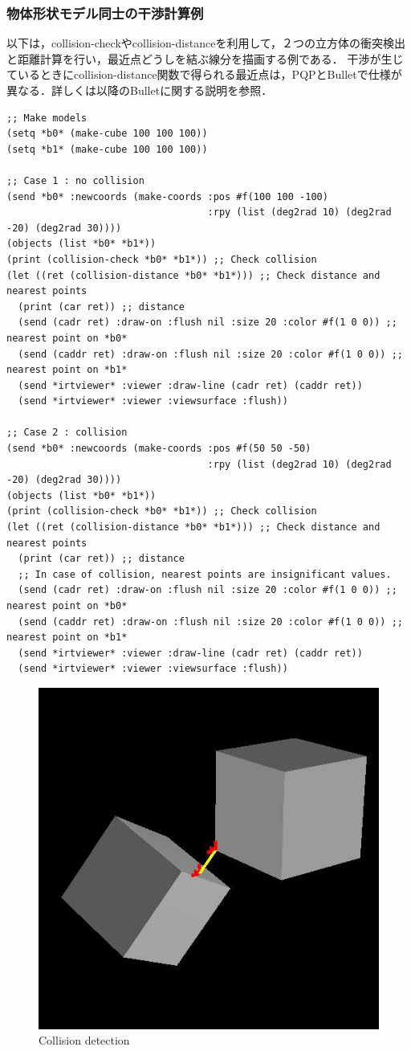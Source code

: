 \subsubsection{物体形状モデル同士の干渉計算例}
以下は，collision-checkやcollision-distanceを利用して，２つの立方体の衝突検出と距離計算を行い，最近点どうしを結ぶ線分を描画する例である．
干渉が生じているときにcollision-distance関数で得られる最近点は，PQPとBulletで仕様が異なる．詳しくは以降のBulletに関する説明を参照．
{\baselineskip=10pt
\begin{verbatim}
;; Make models
(setq *b0* (make-cube 100 100 100))
(setq *b1* (make-cube 100 100 100))

;; Case 1 : no collision
(send *b0* :newcoords (make-coords :pos #f(100 100 -100)
                                   :rpy (list (deg2rad 10) (deg2rad -20) (deg2rad 30))))
(objects (list *b0* *b1*))
(print (collision-check *b0* *b1*)) ;; Check collision
(let ((ret (collision-distance *b0* *b1*))) ;; Check distance and nearest points
  (print (car ret)) ;; distance
  (send (cadr ret) :draw-on :flush nil :size 20 :color #f(1 0 0)) ;; nearest point on *b0*
  (send (caddr ret) :draw-on :flush nil :size 20 :color #f(1 0 0)) ;; nearest point on *b1*
  (send *irtviewer* :viewer :draw-line (cadr ret) (caddr ret))
  (send *irtviewer* :viewer :viewsurface :flush))

;; Case 2 : collision
(send *b0* :newcoords (make-coords :pos #f(50 50 -50)
                                   :rpy (list (deg2rad 10) (deg2rad -20) (deg2rad 30))))
(objects (list *b0* *b1*))
(print (collision-check *b0* *b1*)) ;; Check collision
(let ((ret (collision-distance *b0* *b1*))) ;; Check distance and nearest points
  (print (car ret)) ;; distance
  ;; In case of collision, nearest points are insignificant values.
  (send (cadr ret) :draw-on :flush nil :size 20 :color #f(1 0 0)) ;; nearest point on *b0*
  (send (caddr ret) :draw-on :flush nil :size 20 :color #f(1 0 0)) ;; nearest point on *b1*
  (send *irtviewer* :viewer :draw-line (cadr ret) (caddr ret))
  (send *irtviewer* :viewer :viewsurface :flush))
\end{verbatim}
}

\begin{figure}[htb]
  \begin{center}
    \includegraphics[width=0.50\columnwidth]{fig/collision.jpg}
    \caption{Collision detection}
  \end{center}
\end{figure}

